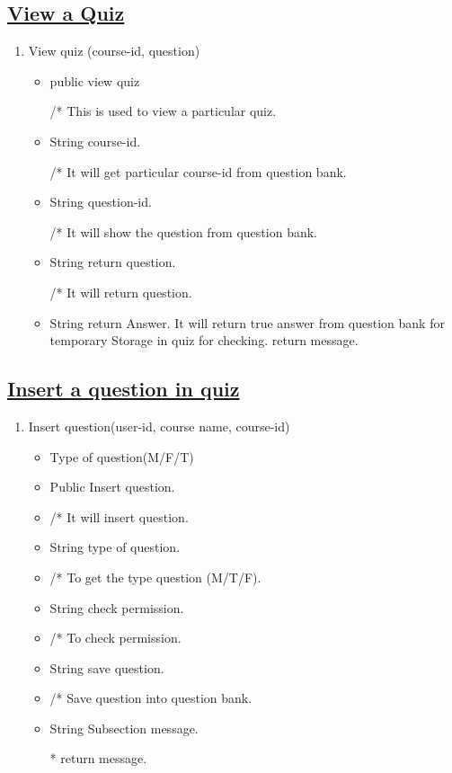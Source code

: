 \documentclass{article}
\begin{document}
\subsection*{\underline{View a Quiz}}
\begin{enumerate}
\item View quiz (course-id, question)
\begin{itemize}
\item public view quiz


/* This is used to view a particular quiz.

\item String course-id.

/* It will get particular course-id from question bank.

\item String question-id.

/* It will show the question from question bank.

\item String return question.

/* It will return question. 

\item String return Answer.
\* It will return true answer from question bank for temporary Storage in quiz for checking.
return message.  
\end{itemize}
\end{enumerate}

\subsection*{\underline{Insert a question in quiz}}
\begin{enumerate}
\item Insert question(user-id, course name, course-id)
\begin{itemize}
\item Type of question(M/F/T) 
\end{itemize}    
\begin{itemize}
\item Public Insert question. 

\item/* It will insert question.

\item String type of question. 

\item/* To get the type question (M/T/F).

\item String check permission.

\item/* To check permission.

\item String save question.

\item /* Save question into question bank.

\item String Subsection message.

* return message.

\end{itemize}
\end{enumerate}
\end{document}
